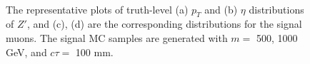 \begin{figure}[!htb]
    \centering
     \\
    \caption{The representative plots of truth-level (a) $p_{T}$ and (b) $\eta$ distributions of $Z'$, and (c), (d) are the corresponding distributions for the signal muons. The signal MC samples are generated with $m=$ 500, 1000 GeV, and $c\tau=$ 100 mm.}
    \label{fig:truth_zp_muon}
\end{figure}


